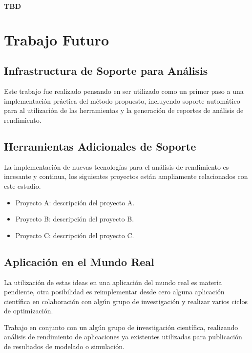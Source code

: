 \documentclass[a4paper]{report}
\begin{document}
\bigskip

{\bf TBD}

\chapter{Trabajo Futuro}

\section{Infrastructura de Soporte para An\'alisis}

Este trabajo fue realizado pensando en ser utilizado como un primer paso
a una implementaci\'on pr\'actica del m\'etodo propuesto, incluyendo soporte
autom\'atico para al utilizaci\'on de las herramientas y la generaci\'on de
reportes de an\'alisis de rendimiento.

\section{Herramientas Adicionales de Soporte}

La implementaci\'on de nuevas tecnolog\'ias para el an\'alisis de rendimiento
es incesante y continua, los siguientes proyectos est\'an ampliamente
relacionados con este estudio.

\begin{itemize}
\item Proyecto A: descripci\'on del proyecto A.
\item Proyecto B: descripci\'on del proyecto B.
\item Proyecto C: descripci\'on del proyecto C.
\end{itemize}

\section{Aplicaci\'on en el Mundo Real}

La utilizaci\'on de estas ideas en una aplicaci\'on del mundo real es materia
pendiente, otra posibilidad es reimplementar desde cero alguna aplicaci\'on
cient\'ifica en colaboraci\'on con alg\'un grupo de investigaci\'on y realizar
varios ciclos de optimizaci\'on.

\bigskip

Trabajo en conjunto con un alg\'un grupo de investigaci\'on cient\'ifica,
realizando an\'alisis de rendimiento de aplicaciones ya existentes utilizadas
para publicaci\'on de resultados de modelado o simulaci\'on.
\end{document}
